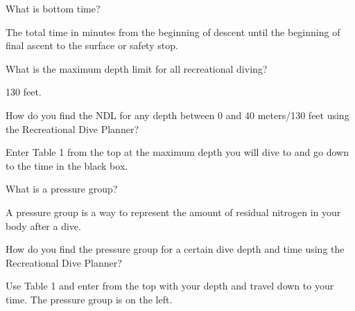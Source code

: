 	\begin{qanda}
		\begin{question}
What is bottom time?
		\end{question}

		\begin{answer}
The total time in minutes from the beginning of descent until the beginning of final ascent to the surface or safety stop.
		\end{answer}
	\end{qanda}

	\begin{qanda}
		\begin{question}
What is the maximum depth limit for all recreational diving?
		\end{question}

		\begin{answer}
130 feet.
		\end{answer}
	\end{qanda}

	\begin{qanda}
		\begin{question}
How do you find the NDL for any depth between 0 and 40 meters/130 feet using the Recreational Dive Planner?
		\end{question}

		\begin{answer}
Enter Table 1 from the top at the maximum depth you will dive to and go down to the time in the black box.
		\end{answer}
	\end{qanda}

	\begin{qanda}
		\begin{question}
What is a pressure group?
		\end{question}

		\begin{answer}
A pressure group is a way to represent the amount of residual nitrogen in your body after a dive.
		\end{answer}
	\end{qanda}

	\begin{qanda}
		\begin{question}
How do you find the pressure group for a certain dive depth and time using the Recreational Dive Planner?
		\end{question}

		\begin{answer}
Use Table 1 and enter from the top with your depth and travel down to your time.  The pressure group is on the left.
		\end{answer}
	\end{qanda}

